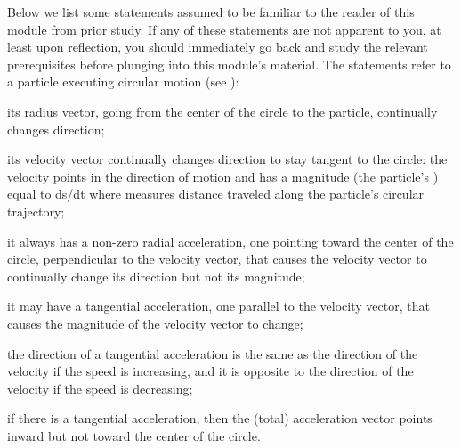 {
Below we list some statements assumed to be familiar to the reader of
this module from prior study.
If any of these statements are not apparent to you, at least upon
reflection, you should immediately go back and study the relevant
prerequisites before plunging into this module's material.
The statements refer to a particle executing circular motion (see ):
\begin{one-digit-list}
\item [1.] its radius vector, going from the center of the circle to the particle,
continually changes direction;
\item [2.] its velocity vector continually changes direction to stay
tangent to the circle: the velocity points in the direction of motion and
has a  magnitude (the particle's ) equal to \m{\mid}ds/dt\m{\mid} where
 measures distance traveled along the particle's circular trajectory;
\item [3.] it always has a non-zero radial acceleration, one pointing toward the
center of the circle, perpendicular to the velocity vector, that causes
the velocity vector to continually change its direction but not its
magnitude;
\item [4.] it may have a tangential acceleration, one parallel to the velocity
vector, that causes the magnitude of the velocity vector to change;
\item [5.] the direction of a tangential acceleration is the same as the
direction of the velocity if the speed is increasing, and it is opposite to
the direction of the velocity if the speed is decreasing;
\item [6.] if there is a tangential acceleration, then the (total) acceleration
vector points inward but not toward the center of the circle.
\end{one-digit-list}


}%
%
